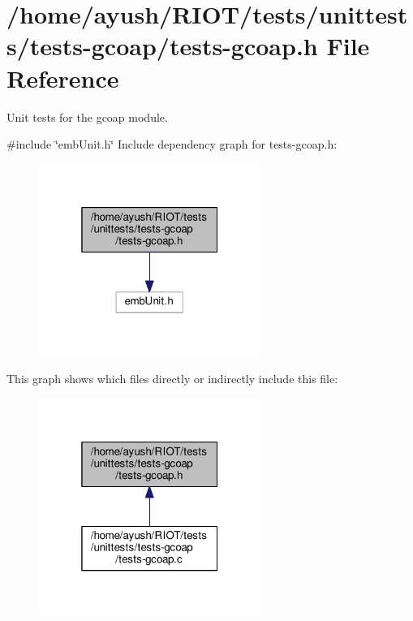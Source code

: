 \hypertarget{tests-gcoap_8h}{}\section{/home/ayush/\+R\+I\+O\+T/tests/unittests/tests-\/gcoap/tests-\/gcoap.h File Reference}
\label{tests-gcoap_8h}


Unit tests for the gcoap module.  


{\ttfamily \#include \char`\"{}emb\+Unit.\+h\char`\"{}}\newline
Include dependency graph for tests-\/gcoap.h\+:
\nopagebreak
\begin{figure}[H]
\begin{center}
\leavevmode
\includegraphics[width=205pt]{tests-gcoap_8h__incl}
\end{center}
\end{figure}
This graph shows which files directly or indirectly include this file\+:
\nopagebreak
\begin{figure}[H]
\begin{center}
\leavevmode
\includegraphics[width=205pt]{tests-gcoap_8h__dep__incl}
\end{center}
\end{figure}
